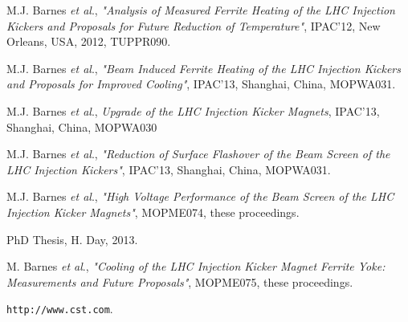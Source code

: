 \documentclass[a4paper,
              ]{jacow}
\begin{document}
\begin{thebibliography}{9}

M.J. Barnes \emph{et al}., \emph{"Analysis of Measured Ferrite Heating of the LHC Injection Kickers and Proposals for Future Reduction of Temperature"}, IPAC'12, New Orleans, USA, 2012, TUPPR090.

M.J. Barnes \emph{et al}., \emph{"Beam Induced Ferrite Heating of the LHC Injection Kickers and Proposals for Improved Cooling"}, IPAC'13, Shanghai, China, MOPWA031.

M.J. Barnes \emph{et al}., \emph{Upgrade of the LHC Injection Kicker Magnets}, IPAC'13, Shanghai, China, MOPWA030

M.J. Barnes \emph{et al}., \emph{"Reduction of Surface Flashover of the Beam Screen of the LHC Injection Kickers"}, IPAC'13, Shanghai, China, MOPWA031.

M.J. Barnes \emph{et al}., \emph{"High Voltage Performance of the Beam Screen of the LHC Injection Kicker Magnets"}, MOPME074, these proceedings.

PhD Thesis, H. Day, 2013.

M. Barnes \emph{et al}., \emph{"Cooling of the LHC Injection Kicker Magnet Ferrite Yoke: Measurements and Future Proposals"}, MOPME075, these proceedings.

\texttt{http://www.cst.com}.

\end{thebibliography}
\end{document}
